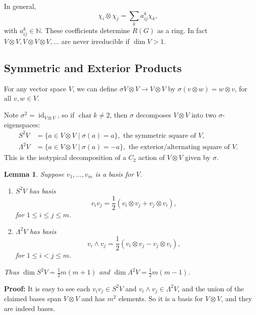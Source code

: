 \documentclass[12pt]{article}
\DeclareMathOperator{\id}{id}
\DeclareMathOperator{\chr}{char}
\newtheorem{lemma}{Lemma}[section]
\theoremstyle{definition}
\theoremstyle{remark}
\begin{document}
In general,
\[
\chi_i \otimes \chi_j = \sum_{k} a_{ij}^{k} \chi_k
,\]
with $a_{ij}^{k} \in \mathbb{N}$. These coefficients determine $R(G)$ as a ring. In fact $V \otimes V, V \otimes V \otimes V, \ldots$ are never irreducible if $\dim V > 1$.

\subsection{Symmetric and Exterior Products}%
\label{sub:symmetric_and_exterior_products}

For any vector space $V$, we can define $\sigma  V \otimes V \to V \otimes V$ by $\sigma(v \otimes w) = w \otimes v$, for all $v, w \in V$.

Note $\sigma^2 = \id_{V \otimes V}$, so if $\chr k \neq 2$, then $\sigma$ decomposes $V \otimes V$ into two $\sigma$-eigenspaces:
\begin{align*}
	S^2V &= \{ a \in V \otimes V \mid \sigma(a) = a\}, \text{ the symmetric square of } V,\\
	\Lambda^2V &= \{ a \in V \otimes V \mid \sigma(a) = -a\}, \text{ the exterior/alternating square of } V.
\end{align*}
This is the isotypical decomposition of a $C_2$ action of $V \otimes V$ given by $\sigma$.

\begin{lemma}
	Suppose $v_1, \ldots, v_m$ is a basis for $V$.
	\begin{enumerate}[\normalfont(i)]
		\item $S^2V$ has basis
			\[
				v_iv_j = \frac{1}{2} (v_i \otimes v_j + v_j \otimes v_i)
			,\]
			for $1 \leq i \leq j \leq m$.
		\item $\Lambda^2V$ has basis
			\[
				v_i \wedge v_j = \frac{1}{2} (v_i \otimes v_j - v_j \otimes v_i)
			,\]
			for $1 \leq i < j \leq m$.
	\end{enumerate}
	Thus $\dim S^2V = \frac{1}{2}m(m+1)$ and $\dim \Lambda^2V = \frac{1}{2}m(m-1)$.
\end{lemma}

\begin{adjustbox}{minipage = \columnwidth - 25.5pt, margin=1em, frame=1pt, margin=0em}
\textbf{Proof:} It is easy to see each $v_iv_j \in S^2V$ and $v_i \wedge v_j \in \Lambda^2V$, and the union of the claimed bases span $V \otimes V$ and has $m^2$ elements. So it is a basis for $V \otimes V$, and they are indeed bases.
\end{adjustbox}
\end{document}

